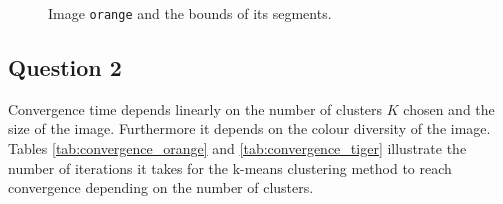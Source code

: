 {\begin{minipage}{\linewidth}
\begin{minipage}{0.45\linewidth}
\begin{figure}[H]
      \caption{Image \texttt{orange} and the bounds of its segments.}
      \label{fig:orange_segmented_bounds}
    \end{figure}
  \end{minipage}
\end{minipage}
}


\subsection{Question 2}
Convergence time depends linearly on the number of clusters $K$ chosen and the
size of the image.
Furthermore it depends on the colour diversity of the image.
Tables \ref{tab:convergence_orange} and \ref{tab:convergence_tiger} illustrate
the number of iterations it takes for the k-means clustering method to
reach convergence depending on the number of clusters.

